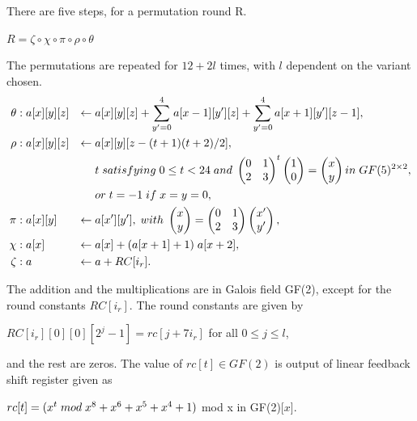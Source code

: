   There are five steps, for a permutation round R. 
  \begin{center}$R = \zeta \circ \chi \circ \pi \circ \rho \circ \theta$\end{center}
  The permutations are repeated for $12 + 2l$ times, with $l$ dependent on the variant chosen. \\
  \begin{align*}
    \theta &: a[x][y][z] & \gets & \thickspace a[x][y][z] + \displaystyle\sum\limits_{y' = 0}^{4} a[x - 1][y'][z] + \displaystyle\sum\limits_{y' = 0}^{4} a[x + 1][y'][z - 1], \\
    \rho &: a[x][y][z] & \gets & \thickspace a[x][y][z - (t + 1)(t + 2) / 2], \\
    & & & \thickspace t \thickspace satisfying \thickspace 0 \leq t < 24 \thickspace and \thickspace
    \begin{pmatrix} 0 & 1 \\ 2 & 3 \end{pmatrix}^{t} \begin{pmatrix} 1 \\ 0 \end{pmatrix} = \begin{pmatrix} x \\ y \end{pmatrix}
    in \thickspace GF(5)^{2 \times 2}, \\
    & & & \thickspace or \thickspace t = -1 \thickspace if \thickspace x = y = 0, \\
    \pi &: a[x][y] & \gets & \thickspace a[x'][y'], \thickspace with \thickspace
    \begin{pmatrix} x \\ y \end{pmatrix} = \begin{pmatrix} 0 & 1 \\ 2 & 3 \end{pmatrix} \begin{pmatrix} x' \\ y'\end{pmatrix}, \\
    \chi &: a[x] & \gets & \thickspace a[x] + (a[x + 1] + 1) \thickspace a[x + 2], \\
    \zeta &: a & \gets & \thickspace a + RC[i_{r}].
  \end{align*}

  The addition and the multiplications are in Galois field GF(2), except for the round constants $RC[i_{r}]$. The round constants 
  are given by
  \begin{center}$RC[i_{r}][0][0][2^{j} - 1] = rc[j + 7i_{r}]$ for all $ 0 \leq j \leq l$,\end{center}
  and the rest are zeros. The value of $rc[t] \in GF(2)$ is output of linear feedback shift register given as
  \begin{center}$rc[t] = (x^{t} \thickspace mod \thickspace x^{8} + x^{6} + x^{5} + x^{4} + 1)$ mod x in GF(2)[$x$].\end{center}

